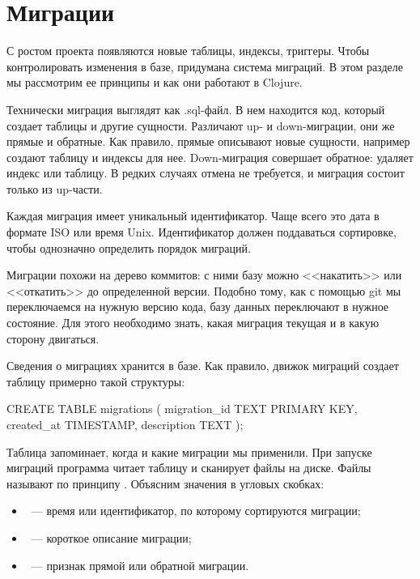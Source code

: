 \section{Миграции}

С ростом проекта появляются новые таблицы, индексы, триггеры. Чтобы контролировать изменения в базе, придумана система миграций. В этом разделе мы рассмотрим ее принципы и как они работают в Clojure.

Технически миграция выглядят как .sql-файл. В нем находится код, который создает таблицы и другие сущности. Различают up- и down-миграции, они же прямые и обратные. Как правило, прямые описывают новые сущности, например создают таблицу и индексы для нее. Down-миграция совершает обратное: удаляет индекс или таблицу. В редких случаях отмена не требуется, и миграция состоит только из up-части.

Каждая миграция имеет уникальный идентификатор. Чаще всего это дата в формате ISO или время Unix. Идентификатор должен поддаваться сортировке, чтобы однозначно определить порядок миграций.

Миграции похожи на дерево коммитов: с ними базу можно <<накатить>> или <<откатить>> до определенной версии. Подобно тому, как с помощью git мы переключаемся на нужную версию кода, базу данных переключают в нужное состояние. Для этого необходимо знать, какая миграция текущая и в какую сторону двигаться.

Сведения о миграциях хранится в базе. Как правило, движок миграций создает таблицу  примерно такой структуры:

\begin{english}
  \begin{sql}
CREATE TABLE migrations (
  migration_id TEXT PRIMARY KEY,
  created_at TIMESTAMP,
  description TEXT
);
  \end{sql}
\end{english}

Таблица запоминает, когда и какие миграции мы применили. При запуске миграций программа читает таблицу и сканирует файлы на диске. Файлы называют по принципу . Объясним значения в угловых скобках:

\begin{itemize}

\item
  ~--- время или идентификатор, по которому сортируются миграции;

\item
  ~--- короткое описание миграции;

\item
  ~--- признак прямой или обратной миграции.

\end{itemize}

